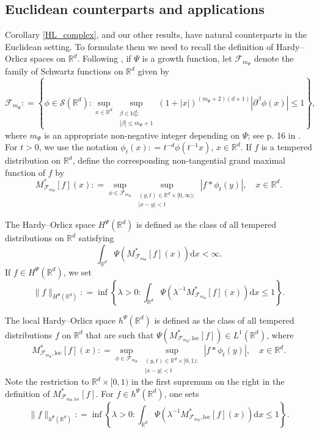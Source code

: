 \documentclass[a4paper, leqno, 10pt]{amsart}
\numberwithin{equation}{section}
\newcommand{\dd}{\mathrm{d}}
\newcommand{\R}{\mathbb{R}}
\newcommand{\brkt}[1]{\left(#1\right)}
\newcommand{\abs}[1]{\left|#1\right|}
\newcommand{\N}{\mathbb{N}}
\begin{document}
\subsection*{Euclidean counterparts and applications}
Corollary \ref{HL_complex}, and our other results, have natural counterparts in the Euclidean setting. To formulate them we need to recall the definition of Hardy--Orlicz spaces on $\R^d$.  Following \cite{YLK}, if $\Psi$ is a growth function, let $ \mathcal{F}_{m_{\Psi}} $ denote  the family of Schwartz functions on $\R^d$ given by
\[
\mathcal{F}_{m_{\Psi}} : = \left\{ \phi \in \mathcal{S} (\R^d) :  \sup_{x \in \R^d} \sup_{\substack{ \beta \in \N_0^d : \\ |\beta| \leq m_{\Psi} +1 }} (1+|x|)^{(m_{\Psi}+2) (d+1)} \abs{\partial^{\beta} \phi (x)} \leq 1 \right\} ,
\]
where $m_{\Psi}$ is an appropriate non-negative integer depending on $\Psi$; see p. 16 in \cite{YLK}. 
For $t > 0$, we use the notation $\phi_{t} (x) : = t^{-d} \phi (t^{-1}x)$, $x \in \R^d$.  If $f$ is a tempered distribution on $\R^d$, define the corresponding non-tangential grand maximal function of $f$ by
\[
M_{ \mathcal{F}_{m_{\Psi}}}^{\ast} [f] (x) : = \sup_{\phi \in  \mathcal{F}_{m_{\Psi}}} \sup_{\substack{ (y,t ) \in \R^d  \times [0, \infty) : \\ |x-y| <t }  } \abs{ f \ast \phi_{t} (y)}, \quad x \in \R^d . 
\]
%

The Hardy--Orlicz space $H^{\Psi} (\R^d)$ is defined as the class of all tempered distributions on $\R^d$ satisfying
\[
\int_{\R^d} \Psi \brkt{M_{ \mathcal{F}_{m_{\Psi}}}^{\ast} [f ] (x)} \dd x < \infty. 
\]
If $f \in H^{\Psi} (\R^d)$, we set
\[ \| f \|_{H^{\Psi} (\R^d)} : = \inf \left\{ \lambda > 0 :   \int_{\R^d}    \Psi \brkt{\lambda^{-1} M_{ \mathcal{F}_{m_{\Psi}}}^{\ast} [f ] (x)}  \dd x   \leq 1 \right\} . 
\]

%

The local Hardy--Orlicz space $h^{\Psi} (\R^d)$ is defined as the class of all tempered distributions $f$ on $\R^d$ that are such that $ \Psi ( M_{ \mathcal{F}_{m_{\Psi}}, \mathrm{loc}}^{\ast} [f ]  ) \in L^1 (\R^d) $, where 
\[
M_{ \mathcal{F}_{m_{\Psi}}, \mathrm{loc}}^{\ast} [f ] (x) : = \sup_{\phi \in  \mathcal{F}_{m_{\Psi}}} \sup_{\substack{ (y,t ) \in \R^d  \times [0, 1) : \\ |x-y| <t }  } \abs{ f \ast \phi_{t} (y)}, \quad x \in \R^d .
\]
Note the restriction to $\R^d\times [0,1)$ in the first supremum on the right in the definition of $M^*_{\mathcal{F}_{m_{\Psi},\mathrm{loc}}}[f]$. For $f \in h^{\Psi} (\R^d)$, one sets
\[
\| f \|_{h^{\Psi} (\R^d)} : = \inf \left\{ \lambda > 0 :   \int_{\R^d}    \Psi \brkt{\lambda^{-1} M_{ \mathcal{F}_{m_{\Psi}}, \mathrm{loc}}^{\ast} [f ] (x)}  \dd x   \leq 1 \right\} . 
\]
\end{document}
